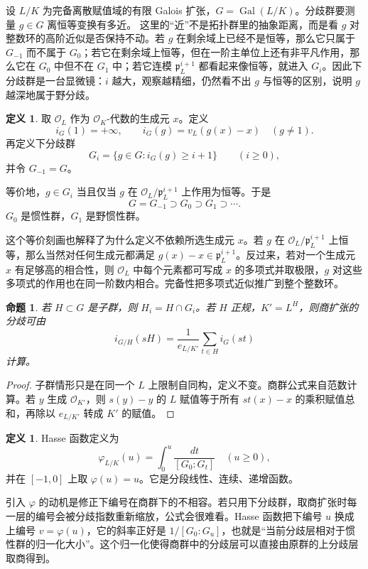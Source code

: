 \documentclass[11pt,a4paper,openany]{ctexbook}
\numberwithin{equation}{chapter}
\newcommand{\Gal}{\operatorname{Gal}}
\theoremstyle{plain}
\newtheorem{proposition}[theorem]{命题}
\theoremstyle{definition}
\newtheorem{definition}[theorem]{定义}
\theoremstyle{remark}
\begin{document}
设 $L/K$ 为完备离散赋值域的有限 Galois 扩张，$G=\Gal(L/K)$。分歧群要测量 $g\in G$ 离恒等变换有多近。
这里的“近”不是拓扑群里的抽象距离，而是看 $g$ 对整数环的高阶近似是否保持不动。若 $g$ 在剩余域上已经不是恒等，那么它只属于 $G_{-1}$ 而不属于 $G_0$；若它在剩余域上恒等，但在一阶主单位上还有非平凡作用，那么它在 $G_0$ 中但不在 $G_1$ 中；若它连模 $\mathfrak p_L^{i+1}$ 都看起来像恒等，就进入 $G_i$。因此下分歧群是一台显微镜：$i$ 越大，观察越精细，仍然看不出 $g$ 与恒等的区别，说明 $g$ 越深地属于野分歧。

\begin{definition}
取 $\mathcal O_L$ 作为 $\mathcal O_K$-代数的生成元 $x$。定义
\[
  i_G(1)=+\infty,\qquad i_G(g)=v_L(g(x)-x)\quad(g\ne1).
\]
再定义下分歧群
\[
  G_i=\{g\in G:i_G(g)\ge i+1\}\qquad(i\ge0),
\]
并令 $G_{-1}=G$。
\end{definition}

等价地，$g\in G_i$ 当且仅当 $g$ 在 $\mathcal O_L/\mathfrak p_L^{i+1}$ 上作用为恒等。于是
\[
  G=G_{-1}\supset G_0\supset G_1\supset\cdots.
\]
$G_0$ 是惯性群，$G_1$ 是野惯性群。

这个等价刻画也解释了为什么定义不依赖所选生成元 $x$。若 $g$ 在 $\mathcal O_L/\mathfrak p_L^{i+1}$ 上恒等，那么当然对任何生成元都满足 $g(x)-x\in\mathfrak p_L^{i+1}$。反过来，若对一个生成元 $x$ 有足够高的相合性，则 $\mathcal O_L$ 中每个元素都可写成 $x$ 的多项式并取极限，$g$ 对这些多项式的作用也在同一阶数内相合。完备性把多项式近似推广到整个整数环。

\begin{proposition}
若 $H\subset G$ 是子群，则 $H_i=H\cap G_i$。若 $H$ 正规，$K'=L^H$，则商扩张的分歧可由
\[
  i_{G/H}(sH)=\frac1{e_{L/K'}}\sum_{t\in H} i_G(st)
\]
计算。
\end{proposition}

\begin{proof}
子群情形只是在同一个 $L$ 上限制自同构，定义不变。商群公式来自范数计算。若 $y$ 生成 $\mathcal O_{K'}$，则 $s(y)-y$ 的 $L$ 赋值等于所有 $st(x)-x$ 的乘积赋值总和，再除以 $e_{L/K'}$ 转成 $K'$ 的赋值。
\end{proof}

\begin{definition}
Hasse 函数定义为
\[
  \varphi_{L/K}(u)=\int_0^u\frac{dt}{[G_0:G_t]}\quad(u\ge0),
\]
并在 $[-1,0]$ 上取 $\varphi(u)=u$。它是分段线性、连续、递增函数。
\end{definition}

引入 $\varphi$ 的动机是修正下编号在商群下的不相容。若只用下分歧群，取商扩张时每一层的编号会被分歧指数重新缩放，公式会很难看。Hasse 函数把下编号 $u$ 换成上编号 $v=\varphi(u)$，它的斜率正好是 $1/[G_0:G_u]$，也就是“当前分歧层相对于惯性群的归一化大小”。这个归一化使得商群中的分歧层可以直接由原群的上分歧层取商得到。
\end{document}
